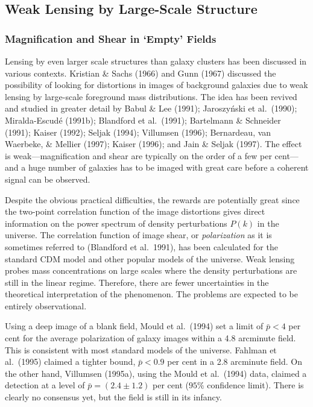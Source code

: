 \documentclass[a4paper,10pt]{article} %
\begin{document}
\subsection{Weak Lensing by Large-Scale Structure}
\label{NB:subsect4.3}

\subsubsection{Magnification and Shear in `Empty' Fields}
\label{NB:subsubsect4.3.1}

Lensing by even larger scale structures than galaxy clusters has been
discussed in various contexts. Kristian \& Sachs (1966) and Gunn
(1967) discussed the possibility of looking for distortions in images
of background galaxies due to weak lensing by large-scale foreground
mass distributions. The idea has been revived and studied in greater
detail by Babul \& Lee (1991); Jaroszy\'nski et al.\ (1990);
Miralda-Escud\'e (1991b); Blandford et al.\ (1991); Bartelmann \&
Schneider (1991); Kaiser (1992); Seljak (1994); Villumsen (1996);
Bernardeau, van Waerbeke, \& Mellier (1997); Kaiser (1996); and Jain
\& Seljak (1997). The effect is weak---magnification and shear are
typically on the order of a few per cent---and a huge number of
galaxies has to be imaged with great care before a coherent signal can
be observed.

Despite the obvious practical difficulties, the rewards are
potentially great since the two-point correlation function of the
image distortions gives direct information on the power spectrum of
density perturbations $P(k)$ in the universe. The correlation function
of image shear, or {\em polarization\/} as it is sometimes referred to
(Blandford et al.\ 1991), has been calculated for the standard CDM
model and other popular models of the universe. Weak lensing probes
mass concentrations on large scales where the density perturbations
are still in the linear regime. Therefore, there are fewer
uncertainties in the theoretical interpretation of the phenomenon. The
problems are expected to be entirely observational.

Using a deep image of a blank field, Mould et al.\ (1994) set a limit
of $\bar p<4$ per cent for the average polarization of galaxy images
within a 4.8 arcminute field. This is consistent with most standard
models of the universe. Fahlman et al.\ (1995) claimed a tighter
bound, $\bar p<0.9$ per cent in a 2.8 arcminute field. On the other
hand, Villumsen (1995a), using the Mould et al.\ (1994) data, claimed
a detection at a level of $\bar p=(2.4\pm1.2)$ per cent ($95\%$
confidence limit). There is clearly no consensus yet, but the field is
still in its infancy.
\end{document}
